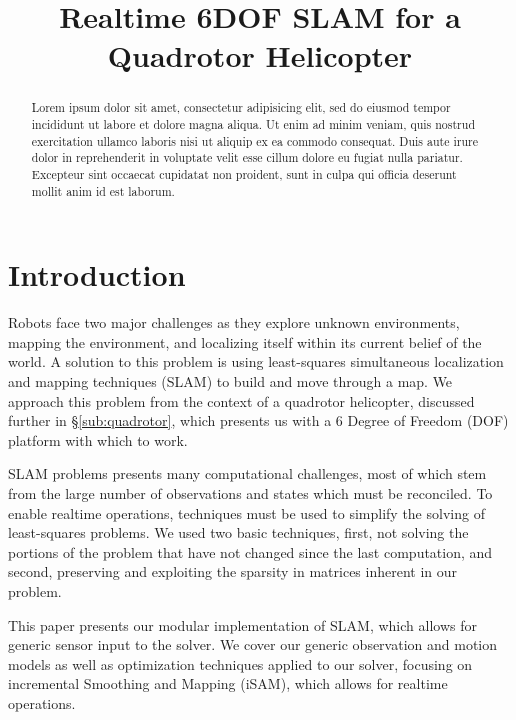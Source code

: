 \documentclass[conference]{IEEEtran}
\title{Realtime 6DOF SLAM for a Quadrotor Helicopter}
\author{\IEEEauthorblockN{Stephen Chaves}
  \and
  \IEEEauthorblockN{Schuyler Cohen}
  \and
  \IEEEauthorblockN{Patrick O'Keefe}
  \and
  \IEEEauthorblockN{Paul Ozog}}
\begin{document}
\maketitle



\begin{abstract}
  Lorem ipsum dolor sit amet, consectetur adipisicing elit, sed do eiusmod tempor incididunt
  ut labore et dolore magna aliqua. Ut enim ad minim veniam, quis nostrud exercitation
  ullamco laboris nisi ut aliquip ex ea commodo consequat. Duis aute irure dolor in
  reprehenderit in voluptate velit esse cillum dolore eu fugiat nulla pariatur. Excepteur
  sint occaecat cupidatat non proident, sunt in culpa qui officia deserunt mollit anim id
  est laborum.
\end{abstract}






\section{Introduction}
\label{sec:introduction}

Robots face two major challenges as they explore unknown environments, mapping the
environment, and localizing itself within its current belief of the world.  A solution to
this problem is using least-squares simultaneous localization and mapping techniques
(SLAM) to build and move through a map.  We approach this problem from the context of a
quadrotor helicopter, discussed further in \S\ref{sub:quadrotor}, which presents us
with a 6 Degree of Freedom (DOF) platform with which to work.

SLAM problems presents many computational challenges, most of which stem from the large
number of observations and states which must be reconciled.  To enable realtime
operations, techniques must be used to simplify the solving of least-squares problems. We
used two basic techniques, first, not solving the portions of the problem that have not
changed since the last computation, and second, preserving and exploiting the sparsity in
matrices inherent in our problem.
 
This paper presents our modular implementation of SLAM, which allows for generic sensor
input to the solver.  We cover our generic observation and motion models as well as
optimization techniques applied to our solver, focusing on incremental Smoothing and
Mapping (iSAM), which allows for realtime operations. \cite{Kaess08tro}
\end{document}
